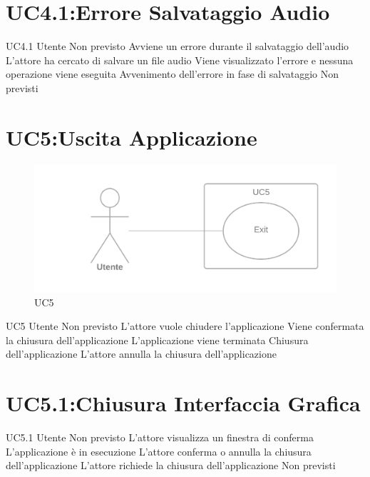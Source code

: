 \documentclass[../AnalisideiRequisiti.tex]{subfiles}
\begin{document}
\section{UC4.1:Errore Salvataggio Audio}
\UserCase
{UC4.1}
{Utente}
{Non previsto}
{Avviene un errore durante il salvataggio dell'audio}
{L'attore ha cercato di salvare un file audio}
{Viene visualizzato l'errore e nessuna operazione viene eseguita}
{Avvenimento dell'errore in fase di salvataggio}
{Non previsti}

\section{UC5:Uscita Applicazione}
\begin{figure}[H]
	\caption{UC5}
	\centering
	\includegraphics[width=\textwidth]{../img/UC05.png}
\end{figure}
\UserCase
{UC5}
{Utente}
{Non previsto}
{L'attore vuole chiudere l'applicazione}
{Viene confermata la chiusura dell'applicazione}
{L'applicazione viene terminata}
{Chiusura dell'applicazione}
{L'attore annulla la chiusura dell'applicazione}

\section{UC5.1:Chiusura Interfaccia Grafica}
\UserCase
{UC5.1}
{Utente}
{Non previsto}
{L'attore visualizza un finestra di conferma}
{L'applicazione è in esecuzione}
{L'attore conferma o annulla la chiusura dell'applicazione}
{L'attore richiede la chiusura dell'applicazione}
{Non previsti}
\end{document}
